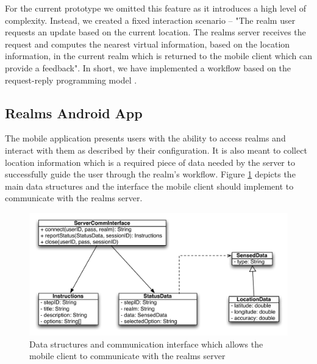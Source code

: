 For the current prototype we omitted this feature as it introduces a high level of complexity. Instead, we created a fixed interaction scenario -- "The realm user requests an update based on the current location. The realms server receives the request and computes the nearest virtual information, based on the location information, in the current realm which is returned to the mobile client which can provide a feedback". In short, we have implemented a workflow based on the request-reply programming model \cite{Coulouris:2005}.

\subsection{Realms Android App} %
\label{sub:realms_android_app}
The mobile application presents users with the ability to access realms and interact with them as described by their configuration. It is also meant to collect location information which is a required piece of data needed by the server to successfully guide the user through the realm's workflow. Figure \ref{fig.design.mobile_client} depicts the main data structures and the interface the mobile client should implement to communicate with the realms server.
\begin{figure}[H]
	\centering
	\includegraphics[width=1.0\linewidth]{fig/mobile_client}
	\caption{Data structures and communication interface which allows the mobile client to communicate with the realms server}
	\label{fig.design.mobile_client}
\end{figure}

